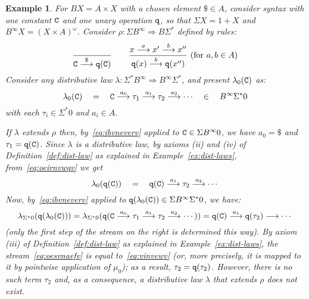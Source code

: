 \documentclass[adraft,copyright,creativecommons]{eptcs}
\newtheorem{example}[theorem]{Example}
\newcommand{\To}{\Longrightarrow}
\newcommand{\Bb}{B^{\infty}}
\newcommand{\Ss}{\Sigma^*}
\renewcommand{\S}{\Sigma}
\newcommand{\goes}[1]{\stackrel{#1}{\longrightarrow}}
\newcommand{\labA}{\$}
\begin{document}
\begin{example}\label{ex:ivbuqwvw}\rm
For $BX=A\times X$ with a chosen element $\$\in A$, consider syntax with one constant ${\tt C}$ and one unary operation ${\tt q}$, so that $\S X = 1+X$ and $\Bb X=(X\times A)^{\omega}$. Consider $\rho:\S\Bb\To B\Ss$ defined by rules:
\begin{align*}
	\dfrac{}{{\tt C} \goes{\labA} {\tt q(C)}} \qquad \dfrac{x\goes{a}x'\goes{b}x''}{{\tt q}(x)\goes{b}{\tt q}(x'')}\ (\mbox{for }a,b\in A)
\end{align*}
Consider any distributive law $\lambda:\Ss\Bb\To\Bb\Ss$, and present $\lambda_0({\tt C})$ as:
\begin{equation}\label{eq:oeirnvwqv}
	\lambda_0({\tt C}) \quad = \quad {\tt C}\goes{a_0} \tau_1\goes{a_1}\tau_2\goes{a_2}\cdots \quad \in \quad \Bb\Ss0
\end{equation}
with each $\tau_i\in\Ss0$ and $a_i\in A$. 

If $\lambda$ extends $\rho$ then, by~\eqref{eq:ibvneverv} applied to ${\tt C}\in\Sigma\Bb0$, we have $a_0=\labA$ and $\tau_1={\tt q(C)}$.
Since $\lambda$ is a distributive law, by axioms (ii) and (iv) of Definition~\ref{def:dist-law} as explained in Example~\ref{ex:dist-laws}, from~\eqref{eq:oeirnvwqv} we get
\begin{equation}\label{eq:vinvewv}
	\lambda_0({\tt q(C)}) \quad = \quad {\tt q(C)}\goes{a_1}\tau_2\goes{a_2}\cdots
\end{equation}
Now, by~\eqref{eq:ibvneverv} applied to ${\tt q}(\lambda_0({\tt C}))\in\Sigma\Bb\Ss0$, we have:
\begin{equation}\label{eq:oesvnaefv}
	\lambda_{\Ss0}({\tt q}(\lambda_0({\tt C}))) = \lambda_{\Ss0}({\tt q}({\tt C}\goes{a_0} \tau_1\goes{a_1}\tau_2\goes{a_2}\cdots)) = {\tt q(C)}\goes{a_1} {\tt q}(\tau_2)\goes{}\cdots
\end{equation} 
(only the first step of the stream on the right is determined this way). By axiom (iii) of Definition~\ref{def:dist-law} as explained in Example~\ref{ex:dist-laws}, the stream~\eqref{eq:oesvnaefv} is equal to~\eqref{eq:vinvewv} (or, more precisely, it is mapped to it by pointwise application of $\mu_0$); as a result, ${\tau_2}={\tt q}(\tau_2)$. However, there is no such term $\tau_2$ and, as a consequence, a distributive law $\lambda$ that extends $\rho$ does not exist.
\end{example}
\end{document}
